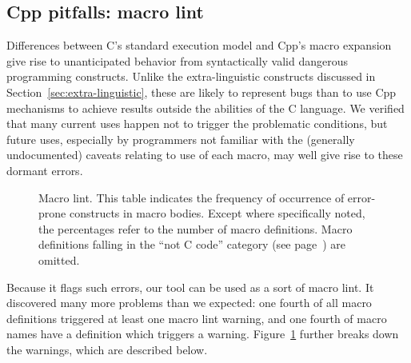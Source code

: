\documentclass[10pt]{article}
\newcommand{\captionsmall}[1]{\caption[]{\small #1}}
\begin{document}
\begin{description}
\end{description}



\subsection{Cpp pitfalls:  macro lint}
\label{sec:lint}

Differences between C's standard execution model and Cpp's macro expansion
give rise to unanticipated behavior from syntactically valid dangerous
programming constructs.  Unlike the extra-linguistic constructs discussed
in Section~\ref{sec:extra-linguistic}, these are likely to represent bugs
than to use Cpp mechanisms to achieve results outside the abilities of the
C language.  We verified that many current uses happen not to trigger the
problematic conditions, but future uses, especially by programmers not
familiar with the (generally undocumented) caveats relating to use of each
macro, may well give rise to these dormant errors.

\begin{figure}
  {\small\centerline{}}
  
  \captionsmall{Macro lint.  This table indicates the frequency of occurrence of
    error-prone constructs in macro bodies.  Except where specifically
    noted, the percentages refer to the number of macro definitions.  Macro
    definitions falling in the ``not C code'' category (see
    page~\pageref{page:not-c-code}) are omitted.}
  \label{fig:macro-lint}
\end{figure}

Because it flags such errors, our tool can be used as a sort of macro lint.
It discovered many more problems than we expected: one fourth of all macro
definitions triggered at least one macro lint warning, and one fourth of
macro names have a definition which triggers a warning.
Figure~\ref{fig:macro-lint} further breaks down the warnings, which are
described below.
\end{document}
